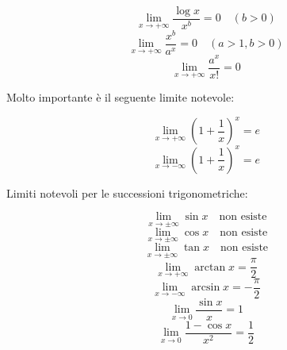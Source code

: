 \documentclass{article}
\begin{document}
\begin{equation}
    \lim_{x\to+\infty}\frac{\log x}{x^b}=0 \quad (b>0)
\end{equation}
\begin{equation}
    \lim_{x\to+\infty}\frac{x^b}{a^x}=0 \quad (a>1,b>0)
\end{equation}
\begin{equation}
    \lim_{x\to+\infty}\frac{a^x}{x!}=0
\end{equation}
\begin{center}
    Molto importante è il seguente limite notevole:
\end{center}
\begin{equation}
    \lim_{x\to+\infty}\left(1+\frac{1}{x}\right)^x=e
\end{equation}
\begin{equation}
    \lim_{x\to-\infty}\left(1+\frac{1}{x}\right)^x=e
\end{equation}
\begin{center}
    Limiti notevoli per le successioni trigonometriche:
\end{center}
\begin{equation}
    \lim_{x\to\pm\infty}\sin x \quad\text{non esiste}
\end{equation}
\begin{equation}
    \lim_{x\to\pm\infty}\cos x \quad\text{non esiste}
\end{equation}
\begin{equation}
    \lim_{x\to\pm\infty}\tan x \quad\text{non esiste}
\end{equation}
\begin{equation}
    \lim_{x\to+\infty}\arctan x=\frac{\pi}{2}
\end{equation}
\begin{equation}
    \lim_{x\to-\infty}\arcsin x=-\frac{\pi}{2}
\end{equation}
\begin{equation}
    \lim_{x\to0}\frac{\sin x}{x}=1
\end{equation}
\begin{equation}
    \lim_{x\to0}\frac{1-\cos x}{x^2}=\frac{1}{2}
\end{equation}
\end{document}
